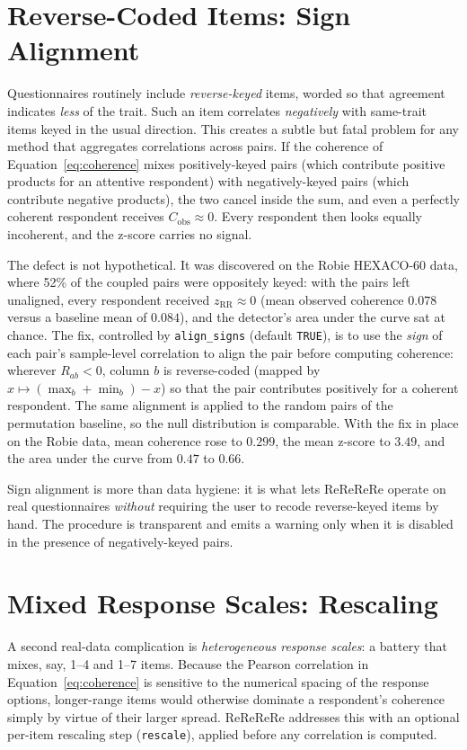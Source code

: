 \section{Reverse-Coded Items: Sign Alignment}

Questionnaires routinely include \emph{reverse-keyed} items, worded so that
agreement indicates \emph{less} of the trait. Such an item correlates
\emph{negatively} with same-trait items keyed in the usual direction. This
creates a subtle but fatal problem for any method that aggregates correlations
across pairs. If the coherence of Equation~\ref{eq:coherence} mixes
positively-keyed pairs (which contribute positive products for an attentive
respondent) with negatively-keyed pairs (which contribute negative products),
the two cancel inside the sum, and even a perfectly coherent respondent receives
$C_{\text{obs}} \approx 0$. Every respondent then looks equally incoherent, and
the z-score carries no signal.

The defect is not hypothetical. It was discovered on the Robie HEXACO-60 data,
where 52\% of the coupled pairs were oppositely keyed: with the pairs left
unaligned, every respondent received $z_{\text{RR}} \approx 0$ (mean observed
coherence $0.078$ versus a baseline mean of $0.084$), and the detector's area
under the curve sat at chance. The fix, controlled by \texttt{align\_signs}
(default \texttt{TRUE}), is to use the \emph{sign} of each pair's sample-level
correlation to align the pair before computing coherence: wherever
$R_{ab} < 0$, column $b$ is reverse-coded (mapped by
$x \mapsto (\max_b + \min_b) - x$) so that the pair contributes positively for a
coherent respondent. The same alignment is applied to the random pairs of the
permutation baseline, so the null distribution is comparable. With the fix in
place on the Robie data, mean coherence rose to $0.299$, the mean z-score to
$3.49$, and the area under the curve from $0.47$ to $0.66$.

Sign alignment is more than data hygiene: it is what lets ReReReRe operate on
real questionnaires \emph{without} requiring the user to recode reverse-keyed
items by hand. The procedure is transparent and emits a warning only when it is
disabled in the presence of negatively-keyed pairs.

\section{Mixed Response Scales: Rescaling}

A second real-data complication is \emph{heterogeneous response scales}: a
battery that mixes, say, 1--4 and 1--7 items. Because the Pearson correlation in
Equation~\ref{eq:coherence} is sensitive to the numerical spacing of the
response options, longer-range items would otherwise dominate a respondent's
coherence simply by virtue of their larger spread. ReReReRe addresses this with
an optional per-item rescaling step (\texttt{rescale}), applied before any
correlation is computed.


